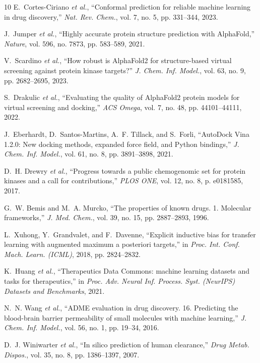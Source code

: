 \documentclass[journal]{IEEEtran}
\begin{document}
\begin{thebibliography}{10}
E.~Cortes-Ciriano \emph{et al.}, ``Conformal prediction for reliable machine learning in drug discovery,'' \emph{Nat. Rev. Chem.}, vol. 7, no. 5, pp. 331--344, 2023.

J.~Jumper \emph{et al.}, ``Highly accurate protein structure prediction with AlphaFold,'' \emph{Nature}, vol. 596, no. 7873, pp. 583--589, 2021.

V.~Scardino \emph{et al.}, ``How robust is AlphaFold2 for structure-based virtual screening against protein kinase targets?'' \emph{J. Chem. Inf. Model.}, vol. 63, no. 9, pp. 2682--2695, 2023.

S.~Drakulic \emph{et al.}, ``Evaluating the quality of AlphaFold2 protein models for virtual screening and docking,'' \emph{ACS Omega}, vol. 7, no. 48, pp. 44101--44111, 2022.

J.~Eberhardt, D.~Santos-Martins, A.~F. Tillack, and S.~Forli, ``AutoDock Vina 1.2.0: New docking methods, expanded force field, and Python bindings,'' \emph{J. Chem. Inf. Model.}, vol. 61, no. 8, pp. 3891--3898, 2021.

D.~H. Drewry \emph{et al.}, ``Progress towards a public chemogenomic set for protein kinases and a call for contributions,'' \emph{PLOS ONE}, vol. 12, no. 8, p. e0181585, 2017.

G.~W. Bemis and M.~A. Murcko, ``The properties of known drugs. 1. Molecular frameworks,'' \emph{J. Med. Chem.}, vol. 39, no. 15, pp. 2887--2893, 1996.

L.~Xuhong, Y.~Grandvalet, and F.~Davenne, ``Explicit inductive bias for transfer learning with augmented maximum a posteriori targets,'' in \emph{Proc. Int. Conf. Mach. Learn. (ICML)}, 2018, pp. 2824--2832.

K.~Huang \emph{et al.}, ``Therapeutics Data Commons: machine learning datasets and tasks for therapeutics,'' in \emph{Proc. Adv. Neural Inf. Process. Syst. (NeurIPS) Datasets and Benchmarks}, 2021.

N.~N. Wang \emph{et al.}, ``ADME evaluation in drug discovery. 16. Predicting the blood-brain barrier permeability of small molecules with machine learning,'' \emph{J. Chem. Inf. Model.}, vol. 56, no. 1, pp. 19--34, 2016.

D.~J. Winiwarter \emph{et al.}, ``In silico prediction of human clearance,'' \emph{Drug Metab. Dispos.}, vol. 35, no. 8, pp. 1386--1397, 2007.


\end{thebibliography}
\end{document}
